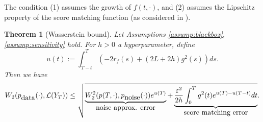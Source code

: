 \documentclass[letterpaper,11pt,reqno]{amsart}
\newtheorem{theorem}{Theorem}[section]
\numberwithin{equation}{section}
\begin{document}
\quad The condition (1) assumes the growth of $f(t, \cdot)$,
and (2) assumes the Lipschitz property of the score matching function (as considered in \cite{KW22}). 
\begin{theorem}[Wasserstein bound]
\label{thm:sensitivity}
\cite{TZ24}
Let Assumptions \ref{assump:blackbox}, \ref{assump:sensitivity} hold.
For $h > 0$ a hyperparameter,
define
\begin{equation}
\label{eq:uv}
u(t):=\int_{T-t}^T \left(-2 r_f(s) + (2L + 2h) g^2(s) \right)ds.
\end{equation}
Then we have 
\begin{equation}
\label{eq:sensitivity}
W_2(p_{\tiny \mbox{data}}(\cdot), \mathcal{L}(Y_T)) \le \sqrt{\underbrace{W_2^2(p(T, \cdot), p_{\tiny \mbox{noise}}(\cdot)) e^{u(T)}}_{\tiny \mbox{noise approx. error}} + \underbrace{\frac{\varepsilon^2}{2h} \int_0^T g^2(t) e^{u(T)-u(T-t)} dt}_{\tiny \mbox{score matching error}}}.
\end{equation}
\end{theorem}
\end{document}
